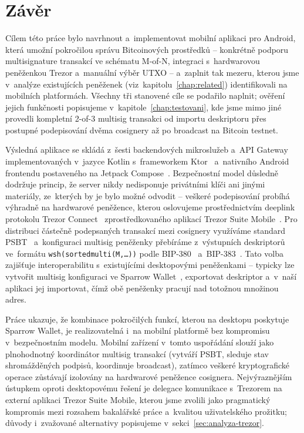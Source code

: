 \chapter*{Závěr}
\label{chap:zaver}

Cílem této práce bylo navrhnout a~implementovat mobilní aplikaci pro Android,
která umožní pokročilou správu Bitcoinových prostředků -- konkrétně podporu
multisignature transakcí ve schématu M-of-N, integraci s~hardwarovou peněženkou
Trezor a~manuální výběr UTXO -- a~zaplnit tak mezeru, kterou jsme v~analýze
existujících peněženek (viz~kapitolu~\ref{chap:related}) identifikovali na
mobilních platformách. Všechny tři stanovené cíle se podařilo naplnit;
ověření jejich funkčnosti popisujeme v~kapitole~\ref{chap:testovani}, kde jsme
mimo jiné provedli kompletní 2-of-3 multisig transakci od importu deskriptoru
přes postupné podepisování dvěma cosignery až po broadcast na Bitcoin testnet.

Výsledná aplikace se skládá z~šesti backendových mikroslužeb a~API Gateway
implementovaných v~jazyce Kotlin s~frameworkem Ktor~\cite{KtorFramework}
a~nativního Android frontendu postaveného na Jetpack Compose~\cite{JetpackCompose}.
Bezpečnostní model důsledně dodržuje princip, že server nikdy nedisponuje
privátními klíči ani jinými materiály, ze~kterých by je bylo možné odvodit --
veškeré podepisování probíhá výhradně na hardwarové peněžence, kterou
oslovujeme prostřednictvím deeplink protokolu Trezor Connect~\cite{TrezorConnect}
zprostředkovaného aplikací Trezor Suite Mobile~\cite{TrezorSuite}.
Pro distribuci částečně podepsaných transakcí mezi cosignery
využíváme standard PSBT~\cite{BIP174} a~konfiguraci multisig peněženky
přebíráme z~výstupních deskriptorů ve~formátu \texttt{wsh(sortedmulti(M,\ldots))}
podle BIP-380~\cite{BIP380} a~BIP-383~\cite{BIP383}. Tato volba zajišťuje
interoperabilitu s~existujícími desktopovými peněženkami -- typicky lze
vytvořit multisig konfiguraci ve Sparrow Wallet~\cite{SparrowWallet}, exportovat
deskriptor a~v~naší aplikaci jej importovat, čímž obě peněženky pracují nad
totožnou množinou adres.

Práce ukazuje, že kombinace pokročilých funkcí, kterou na desktopu poskytuje
Sparrow Wallet, je realizovatelná i~na mobilní platformě bez kompromisu
v~bezpečnostním modelu. Mobilní zařízení v~tomto uspořádání slouží jako
plnohodnotný koordinátor multisig transakcí (vytváří PSBT, sleduje stav
shromážděných podpisů, koordinuje broadcast), zatímco veškeré kryptografické
operace zůstávají izolovány na hardwarové peněžence cosignera. Nejvýraznějším
ústupkem oproti desktopovému řešení je delegace komunikace s~Trezorem na
externí aplikaci Trezor Suite Mobile, kterou jsme zvolili jako pragmatický
kompromis mezi rozsahem bakalářské práce a~kvalitou uživatelského prožitku;
důvody i~zvažované alternativy popisujeme v~sekci~\ref{sec:analyza-trezor}.

